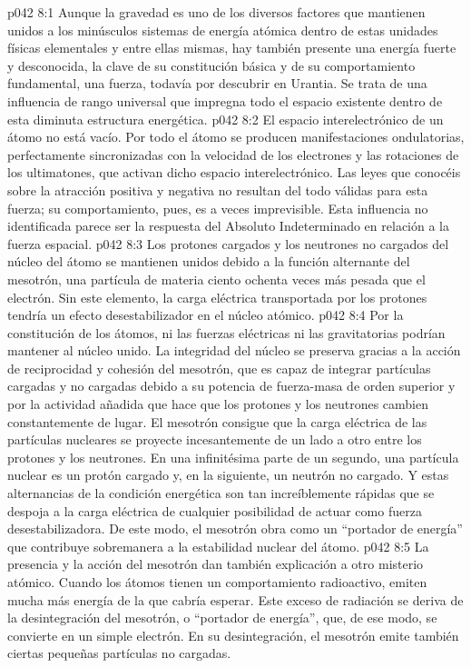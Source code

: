 \vs p042 8:1 Aunque la gravedad es uno de los diversos factores que mantienen unidos a los minúsculos sistemas de energía atómica dentro de estas unidades físicas elementales y entre ellas mismas, hay también presente una energía fuerte y desconocida, la clave de su constitución básica y de su comportamiento fundamental, una fuerza, todavía por descubrir en Urantia. Se trata de una influencia de rango universal que impregna todo el espacio existente dentro de esta diminuta estructura energética.
\vs p042 8:2 El espacio interelectrónico de un átomo no está vacío. Por todo el átomo se producen manifestaciones ondulatorias, perfectamente sincronizadas con la velocidad de los electrones y las rotaciones de los ultimatones, que activan dicho espacio interelectrónico. Las leyes que conocéis sobre la atracción positiva y negativa no resultan del todo válidas para esta fuerza; su comportamiento, pues, es a veces imprevisible. Esta influencia no identificada parece ser la respuesta del Absoluto Indeterminado en relación a la fuerza espacial.
\vs p042 8:3 \pc Los protones cargados y los neutrones no cargados del núcleo del átomo se mantienen unidos debido a la función alternante del mesotrón, una partícula de materia ciento ochenta veces más pesada que el electrón. Sin este elemento, la carga eléctrica transportada por los protones tendría un efecto desestabilizador en el núcleo atómico.
\vs p042 8:4 Por la constitución de los átomos, ni las fuerzas eléctricas ni las gravitatorias podrían mantener al núcleo unido. La integridad del núcleo se preserva gracias a la acción de reciprocidad y cohesión del mesotrón, que es capaz de integrar partículas cargadas y no cargadas debido a su potencia de fuerza\hyp{}masa de orden superior y por la actividad añadida que hace que los protones y los neutrones cambien constantemente de lugar. El mesotrón consigue que la carga eléctrica de las partículas nucleares se proyecte incesantemente de un lado a otro entre los protones y los neutrones. En una infinitésima parte de un segundo, una partícula nuclear es un protón cargado y, en la siguiente, un neutrón no cargado. Y estas alternancias de la condición energética son tan increíblemente rápidas que se despoja a la carga eléctrica de cualquier posibilidad de actuar como fuerza desestabilizadora. De este modo, el mesotrón obra como un “portador de energía” que contribuye sobremanera a la estabilidad nuclear del átomo.
\vs p042 8:5 La presencia y la acción del mesotrón dan también explicación a otro misterio atómico. Cuando los átomos tienen un comportamiento radioactivo, emiten mucha más energía de la que cabría esperar. Este exceso de radiación se deriva de la desintegración del mesotrón, o “portador de energía”, que, de ese modo, se convierte en un simple electrón. En su desintegración, el mesotrón emite también ciertas pequeñas partículas no cargadas.
